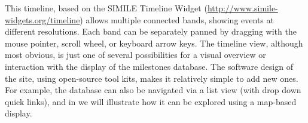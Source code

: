 This timeline, based on the SIMILE Timeline Widget (\url{http://www.simile-widgets.org/timeline}) allows multiple connected bands, showing events at different resolutions.  Each band can be separately panned by dragging with the mouse pointer, scroll wheel, or keyboard arrow keys. The timeline view, although most obvious, is just one of several possibilities for a visual overview or interaction with the display of the milestones database. The software design of the site, using open-source tool kits, makes it relatively simple to add new ones.  For example, the database can also be navigated via a list view (with drop down quick links), and in  we will illustrate how it can be explored using a map-based display.